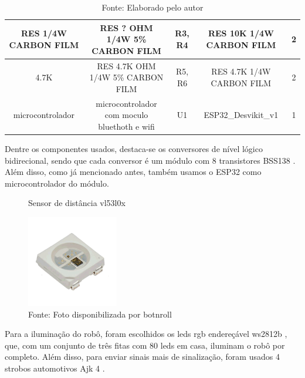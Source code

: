 \documentclass[../delivery_hospital_report.tex]{subfiles}
\begin{document}
\begin{table}[!h]
\begin{adjustbox}{width=\columnwidth,center}
\begin{tabular}{|c|c|c|c|c|}
RES 1/4W   CARBON FILM      & RES ? OHM 1/4W 5\%   CARBON FILM                               & R3, R4                   & RES 10K 1/4W CARBON   FILM  & 2        \\ \hline
4.7K                        & RES 4.7K OHM 1/4W 5\%   CARBON FILM                            & R5, R6                   & RES 4.7K 1/4W CARBON   FILM & 2        \\ \hline
microcontrolador            & microcontrolador com   moculo bluethoth e wifi                 & U1                       & ESP32\_Desvikit\_v1         & 1        \\ \hline

\end{tabular}
\end{adjustbox}
\centering
\caption*{Fonte: Elaborado pelo autor}
\label{table:Componentes Utilizados na placa de Sinalização - Protótipo}
\end{table}

Dentre os componentes usados, destaca-se os conversores de nível lógico bidirecional, sendo que cada conversor é um módulo com 8 transistores BSS138 \cite{BSS138_datasheet} . Além disso, como já mencionado antes, também usamos o ESP32 \cite{esp32} como microcontrolador do módulo.

\begin{figure}
\centering
\caption{ Sensor de distância vl53l0x}\label{wrap-fig:1}
\includegraphics[width=4cm]{modulos/led_rgb_end.png}
\caption*{Fonte: Foto disponibilizada por botnroll}\label{wrap-fig:1}
\end{figure} 

Para a iluminação do robô, foram escolhidos os leds rgb endereçável ws2812b \cite{WS2812B_datasheet}, que, com um conjunto de três fitas com 80 leds em casa, iluminam o robô por completo. Além disso, para enviar sinais mais de sinalização, foram usados 4 strobos automotivos Ajk 4 \cite{strobos_datasheet}.
\end{document}
